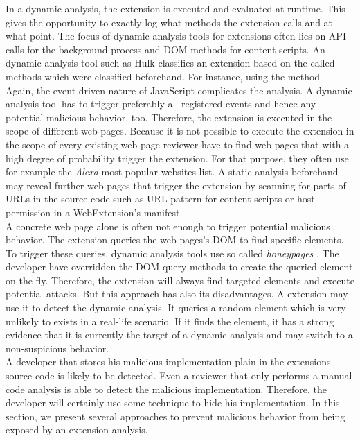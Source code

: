 		In a dynamic analysis, the extension is executed and evaluated at runtime. This gives the opportunity to exactly log what methods the extension calls and at what point. The focus of dynamic analysis tools for extensions often lies on API calls for the background process and DOM methods for content scripts. An dynamic analysis tool such as Hulk classifies an extension based on the called methods which were classified beforehand. For instance, using the method \\ %
		Again, the event driven nature of JavaScript complicates the analysis. A dynamic analysis tool has to trigger preferably all registered events and hence any potential malicious behavior, too. Therefore, the extension is executed in the scope of different web pages. Because it is not possible to execute the extension in the scope of every existing web page reviewer have to find web pages that with a high degree of probability trigger the extension. For that purpose, they often use for example the \textit{Alexa} most popular websites list. A static analysis beforehand may reveal further web pages that trigger the extension by scanning for parts of URLs in the source code such as URL pattern for content scripts or host permission in a WebExtension's manifest. \\ 
		A concrete web page alone is often not enough to trigger potential malicious behavior. The extension queries the web pages's DOM to find specific elements. To trigger these queries, dynamic analysis tools use so called \textit{honeypages} \cite{184485,190984}. The developer have overridden the DOM query methods to create the queried element on-the-fly. Therefore, the extension will always find targeted elements and execute potential attacks. But this approach has also its disadvantages. A extension may use it to detect the dynamic analysis. It queries a random element which is very unlikely to exists in a real-life scenario. If it finds the element, it has a strong evidence that it is currently the target of a dynamic analysis and may switch to a non-suspicious behavior. \\
		
		A developer that stores his malicious implementation plain in the extensions source code is likely to be detected. Even a reviewer that only performs a manual code analysis is able to detect the malicious implementation. Therefore, the developer will certainly use some technique to hide his implementation. In this section, we present several approaches to prevent malicious behavior from being exposed by an extension analysis.

